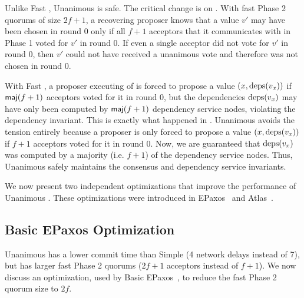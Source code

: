 {}

Unlike Fast \BPaxos{}, Unanimous \BPaxos{} is safe. The critical change is on
. With fast Phase 2 quorums of size $2f+1$, a
recovering proposer knows that a value $v'$ may have been chosen in round $0$
only if all $f+1$ acceptors that it communicates with in Phase 1 voted for $v'$
in round $0$. If even a single acceptor did not vote for $v'$ in round $0$,
then $v'$ could not have received a unanimous vote and therefore was not
chosen in round 0.

With Fast \BPaxos{}, a proposer executing  of
 is forced to propose a value $(x, \text{deps}(v_x))$ if
$\textsf{maj}(f+1)$ acceptors voted for it in round $0$, but the dependencies
$\text{deps}(v_x)$ may have only been computed by $\textsf{maj}(f+1)$ dependency service
nodes, violating the dependency invariant. This is exactly what happened in
. Unanimous \BPaxos{} avoids the tension entirely because
a proposer is only forced to propose a value $(x, \text{deps}(v_x))$ if $f+1$
acceptors voted for it in round $0$. Now, we are guaranteed that $\text{deps}(v_x)$
was computed by a majority (i.e. $f+1$) of the dependency service nodes. Thus,
Unanimous \BPaxos{} safely maintains the consensus and dependency service
invariants.

We now present two independent optimizations that improve the performance of
Unanimous \BPaxos{}. These optimizations were introduced in
EPaxos~\cite{moraru2013there} and Atlas~\cite{enes2020state}.

\subsection{Basic EPaxos Optimization}
Unanimous \BPaxos{} has a lower commit time than Simple \BPaxos{} (4 network
delays instead of 7), but has larger fast Phase 2 quorums ($2f+1$ acceptors
instead of $f+1$). We now discuss an optimization, used by Basic
EPaxos~\cite{moraru2013there}, to reduce the fast Phase 2 quorum size to $2f$.

{}

\newcommand{\change}{\textbf{\textcolor{red}{Change:}}}

